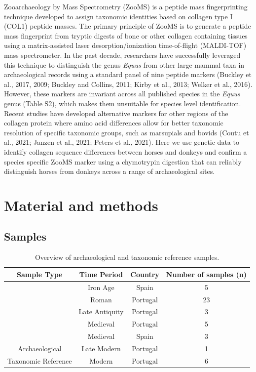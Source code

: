 \documentclass[preprint, 3p, authoryear]{elsarticle} %
\begin{document}
Zooarchaeology by Mass Spectrometry (ZooMS) is a peptide mass fingerprinting technique developed to assign taxonomic identities based on collagen type I (COL1) peptide masses. The primary principle of ZooMS is to generate a peptide mass fingerprint from tryptic digests of bone or other collagen containing tissues using a matrix-assisted laser desorption/ionization time-of-flight (MALDI-TOF) mass spectrometer. In the past decade, researchers have successfully leveraged this technique to distinguish the genus \emph{Equus} from other large mammal taxa in archaeological records using a standard panel of nine peptide markers (Buckley et al., 2017, 2009; Buckley and Collins, 2011; Kirby et al., 2013; Welker et al., 2016). However, these markers are invariant across all published species in the \emph{Equus} genus (Table S2), which makes them unsuitable for species level identification. Recent studies have developed alternative markers for other regions of the collagen protein where amino acid differences allow for better taxonomic resolution of specific taxonomic groups, such as marsupials and bovids (Coutu et al., 2021; Janzen et al., 2021; Peters et al., 2021). Here we use genetic data to identify collagen sequence differences between horses and donkeys and confirm a species specific ZooMS marker using a chymotrypin digestion that can reliably distinguish horses from donkeys across a range of archaeological sites.

\hypertarget{material-and-methods}{%
\section{Material and methods}\label{material-and-methods}}

\hypertarget{samples}{%
\subsection{Samples}\label{samples}}

\begin{table}[H]

\caption{\label{tab:eqtable1}Overview of archaeological and taxonomic reference samples.}
\centering
\begin{tabular}[t]{cccc}
\toprule
Sample Type & Time Period & Country & Number of samples (n)\\
\midrule
 & Iron Age & Spain & 5\\
\cmidrule{2-4}
 & Roman & Portugal & 23\\
\cmidrule{2-4}
 & Late Antiquity & Portugal & 3\\
\cmidrule{2-4}
 & Medieval & Portugal & 5\\
\cmidrule{2-4}
 & Medieval & Spain & 3\\
\cmidrule{2-4}
\multirow{-6}{*}{\centering\arraybackslash Archaeological} & Late Modern & Portugal & 1\\
\cmidrule{1-4}
Taxonomic Reference & Modern & Portugal & 6\\
\bottomrule
\end{tabular}
\end{table}
\end{document}
